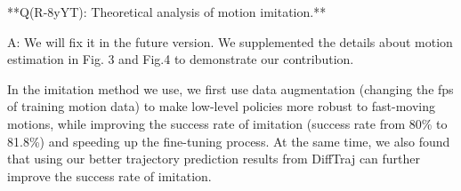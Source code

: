 \documentclass{article}
\begin{document}
\begin{markdown}
**Q(R-8yYT): Theoretical analysis of motion imitation.**

A: We will fix it in the future version. We supplemented the details about motion estimation in Fig. 3 and Fig.4 to demonstrate our contribution.

In the imitation method we use, we first use data augmentation (changing the fps of training motion data) to make low-level policies more robust to fast-moving motions, while improving the success rate of imitation (success rate from 80\% to 81.8\%) and speeding up the fine-tuning process. At the same time, we also found that using our better trajectory prediction results from DiffTraj can further improve the success rate of imitation. 


\end{markdown}
\end{document}
